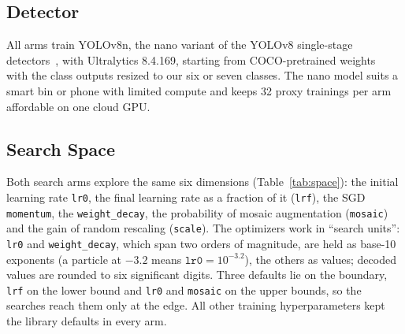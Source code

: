 \subsection{Detector}
\label{subsec:detector}

All arms train YOLOv8n, the nano variant of the YOLOv8 single-stage detectors~\cite{redmon2016you,jocher2023ultralytics}, with Ultralytics 8.4.169, starting from COCO-pretrained weights~\cite{lin2014microsoft} with the class outputs resized to our six or seven classes. The nano model suits a smart bin or phone with limited compute and keeps 32 proxy trainings per arm affordable on one cloud GPU.

\subsection{Search Space}
\label{subsec:space}

Both search arms explore the same six dimensions (Table~\ref{tab:space}): the initial learning rate \texttt{lr0}, the final learning rate as a fraction of it (\texttt{lrf}), the SGD \texttt{momentum}, the \texttt{weight\_decay}, the probability of mosaic augmentation (\texttt{mosaic}) and the gain of random rescaling (\texttt{scale}). The optimizers work in ``search units'': \texttt{lr0} and \texttt{weight\_decay}, which span two orders of magnitude, are held as base-10 exponents (a particle at $-3.2$ means $\texttt{lr0}=10^{-3.2}$), the others as values; decoded values are rounded to six significant digits. Three defaults lie on the boundary, \texttt{lrf} on the lower bound and \texttt{lr0} and \texttt{mosaic} on the upper bounds, so the searches reach them only at the edge. All other training hyperparameters kept the library defaults in every arm.

